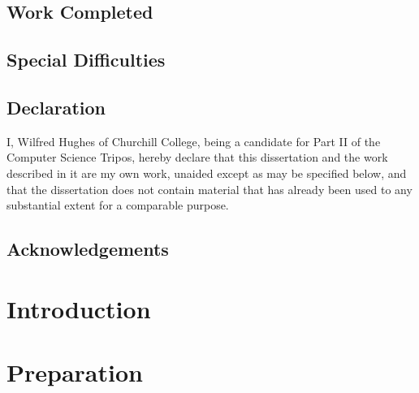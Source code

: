 \documentclass[12pt,twoside,notitlepage]{report}
\begin{document}
\section*{Work Completed}

\section*{Special Difficulties}
 
\newpage
\section*{Declaration}

I, Wilfred Hughes of Churchill College, being a candidate for Part II
of the Computer Science Tripos, hereby declare that this dissertation
and the work described in it are my own work, unaided except as may be
specified below, and that the dissertation does not contain material
that has already been used to any substantial extent for a comparable
purpose.

\bigskip
{}

\medskip
{}

\cleardoublepage

\tableofcontents

\listoffigures

\newpage
\section*{Acknowledgements}



\cleardoublepage        %

\setcounter{page}{1}
\pagestyle{headings}

\chapter{Introduction}


\cleardoublepage

\chapter{Preparation}
\end{document}
